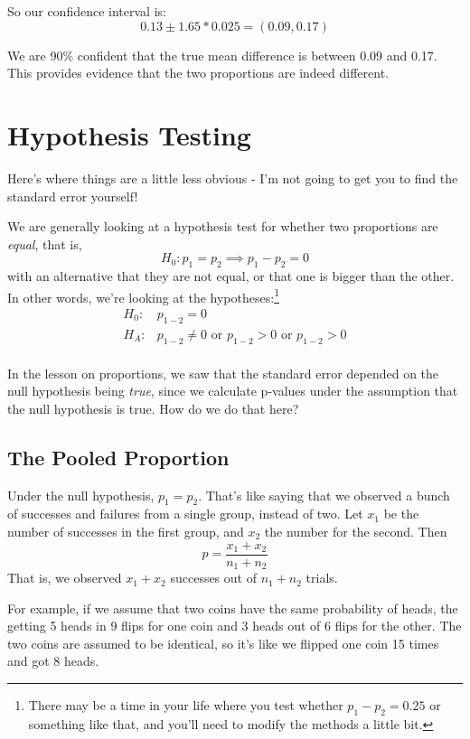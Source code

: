 \documentclass[
  letterpaper,
  DIV=11,
  numbers=noendperiod,
  oneside]{scrreprt}
\begin{document}
So our confidence interval is: \[
0.13 \pm 1.65*0.025 = (0.09, 0.17)
\]

We are 90\% confident that the true mean difference is between 0.09 and
0.17. This provides evidence that the two proportions are indeed
different.

\hypertarget{hypothesis-testing}{%
\section{Hypothesis Testing}\label{hypothesis-testing}}

Here's where things are a little less obvious - I'm not going to get you
to find the standard error yourself!

We are generally looking at a hypothesis test for whether two
proportions are \emph{equal}, that is, \[
H_0: p_1 = p_2\implies p_1 - p_2 = 0
\] with an alternative that they are not equal, or that one is bigger
than the other. In other words, we're looking at the
hypotheses:\footnote{There may be a time in your life where you test
  whether \(p_1 - p_2 = 0.25\) or something like that, and you'll need
  to modify the methods a little bit.} \begin{align*}
H_0: &p_{1-2} = 0\\
H_A: &p_{1-2} \ne 0\text{ or }p_{1-2} > 0\text{ or }p_{1-2} > 0\\
\end{align*}

In the lesson on proportions, we saw that the standard error depended on
the null hypothesis being \emph{true}, since we calculate p-values under
the assumption that the null hypothesis is true. How do we do that here?

\hypertarget{the-pooled-proportion}{%
\subsection{The Pooled Proportion}\label{the-pooled-proportion}}

Under the null hypothesis, \(p_1 = p_2\). That's like saying that we
observed a bunch of successes and failures from a single group, instead
of two. Let \(x_1\) be the number of successes in the first group, and
\(x_2\) the number for the second. Then \[
\hat p = \frac{x_1 + x_2}{n_1 + n_2}
\] That is, we observed \(x_1 + x_2\) successes out of \(n_1 + n_2\)
trials.

For example, if we assume that two coins have the same probability of
heads, the getting 5 heads in 9 flips for one coin and 3 heads out of 6
flips for the other. The two coins are assumed to be identical, so it's
like we flipped one coin 15 times and got 8 heads.
\end{document}
